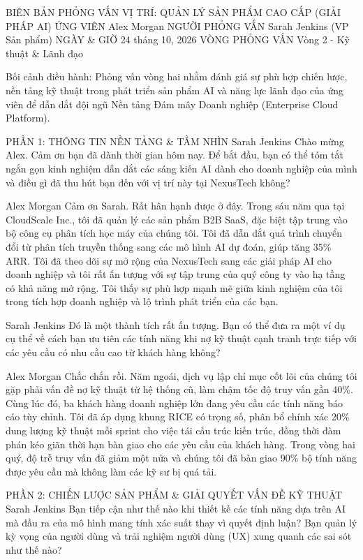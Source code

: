\documentclass[12pt]{article}
\begin{document}
BIÊN BẢN PHỎNG VẤN
VỊ TRÍ: QUẢN LÝ SẢN PHẨM CAO CẤP (GIẢI PHÁP AI)
ỨNG VIÊN
Alex Morgan
NGƯỜI PHỎNG VẤN
Sarah Jenkins (VP Sản phẩm)
NGÀY \& GIỜ
24 tháng 10, 2026
VÒNG PHỎNG VẤN
Vòng 2 - Kỹ thuật \& Lãnh đạo

Bối cảnh điều hành: Phỏng vấn vòng hai nhằm đánh giá sự phù hợp chiến lược, nền tảng kỹ thuật trong phát triển sản phẩm AI và năng lực lãnh đạo của ứng viên để dẫn dắt đội ngũ Nền tảng Đám mây Doanh nghiệp (Enterprise Cloud Platform).

PHẦN 1: THÔNG TIN NỀN TẢNG \& TẦM NHÌN
Sarah Jenkins
Chào mừng Alex. Cảm ơn bạn đã dành thời gian hôm nay. Để bắt đầu, bạn có thể tóm tắt ngắn gọn kinh nghiệm dẫn dắt các sáng kiến AI dành cho doanh nghiệp của mình và điều gì đã thu hút bạn đến với vị trí này tại NexusTech không?

Alex Morgan
Cảm ơn Sarah. Rất hân hạnh được ở đây. Trong sáu năm qua tại CloudScale Inc., tôi đã quản lý các sản phẩm B2B SaaS, đặc biệt tập trung vào bộ công cụ phân tích học máy của chúng tôi. Tôi đã dẫn dắt quá trình chuyển đổi từ phân tích truyền thống sang các mô hình AI dự đoán, giúp tăng 35\% ARR. Tôi đã theo dõi sự mở rộng của NexusTech sang các giải pháp AI cho doanh nghiệp và tôi rất ấn tượng với sự tập trung của quý công ty vào hạ tầng có khả năng mở rộng. Tôi thấy sự phù hợp mạnh mẽ giữa kinh nghiệm của tôi trong tích hợp doanh nghiệp và lộ trình phát triển của các bạn.

Sarah Jenkins
Đó là một thành tích rất ấn tượng. Bạn có thể đưa ra một ví dụ cụ thể về cách bạn ưu tiên các tính năng khi nợ kỹ thuật cạnh tranh trực tiếp với các yêu cầu có nhu cầu cao từ khách hàng không?

Alex Morgan
Chắc chắn rồi. Năm ngoái, dịch vụ lập chỉ mục cốt lõi của chúng tôi gặp phải vấn đề nợ kỹ thuật từ hệ thống cũ, làm chậm tốc độ truy vấn gần 40\%. Cùng lúc đó, ba khách hàng doanh nghiệp lớn đang yêu cầu các tính năng báo cáo tùy chỉnh. Tôi đã áp dụng khung RICE có trọng số, phân bổ chính xác 20\% dung lượng kỹ thuật mỗi sprint cho việc tái cấu trúc kiến trúc, đồng thời đàm phán kéo giãn thời hạn bàn giao cho các yêu cầu của khách hàng. Trong vòng hai quý, độ trễ truy vấn đã giảm một nửa và chúng tôi đã bàn giao 90\% bộ tính năng được yêu cầu mà không làm các kỹ sư bị quá tải.

PHẦN 2: CHIẾN LƯỢC SẢN PHẨM \& GIẢI QUYẾT VẤN ĐỀ KỸ THUẬT
Sarah Jenkins
Bạn tiếp cận như thế nào khi thiết kế các tính năng dựa trên AI mà đầu ra của mô hình mang tính xác suất thay vì quyết định luận? Bạn quản lý kỳ vọng của người dùng và trải nghiệm người dùng (UX) xung quanh các sai sót như thế nào?
\end{document}
